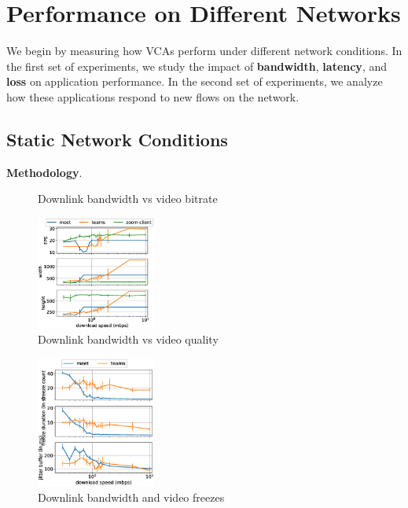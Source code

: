 \section{Performance on Different Networks}\label{sec:methodology}
We begin by measuring how VCAs perform under different network conditions. 
In the first set of experiments, we study the impact of \textbf{bandwidth}, \textbf{latency}, 
and \textbf{loss} on application performance. In the second set of experiments, 
we analyze how these applications respond to new flows on the network.
\subsection{Static Network Conditions}


\noindent\textbf{Methodology}. 


\begin{figure}[]
    \caption{Downlink bandwidth vs video bitrate}
	\label{fig:downlink_video_bitrate}
\end{figure}


\begin{figure}[]
    \includegraphics[width=0.35\textwidth,keepaspectratio]{figures/static/downlink_video_qual_meet_teams_zoom.eps}
    \caption{Downlink bandwidth vs video quality}
    \label{fig:downlink_video_qual}
\end{figure}


\begin{figure}[]
    \includegraphics[width=0.35\textwidth,keepaspectratio]{figures/static/downlink_freeze_meet_teams.eps}
    \caption{Downlink bandwidth and video freezes}
    \label{fig:downlink_freeze}
\end{figure}


